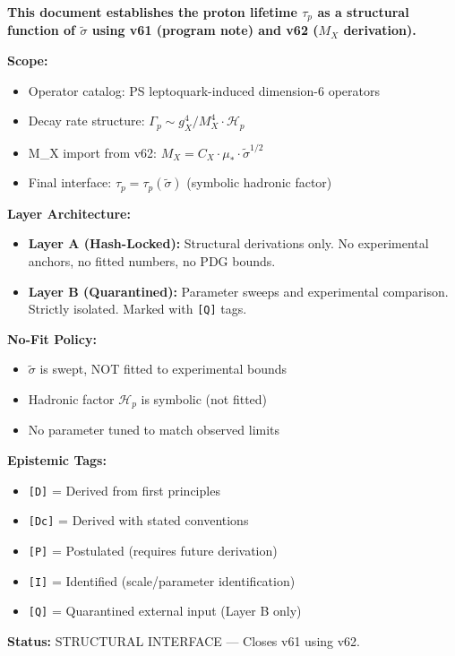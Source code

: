 \documentclass[11pt,a4paper]{article}
\newcommand{\tagD}{\textcolor{green!50!black}{\texttt{[D]}}}
\newcommand{\tagDc}{\textcolor{blue!70!black}{\texttt{[Dc]}}}
\newcommand{\tagP}{\textcolor{orange!80!black}{\texttt{[P]}}}
\newcommand{\tagQ}{\textcolor{red!70!black}{\texttt{[Q]}}}
\newcommand{\tagI}{\textcolor{purple!70!black}{\texttt{[I]}}}
\theoremstyle{definition}
\begin{document}
\begin{readercontract}
\textbf{This document establishes the proton lifetime $\tau_p$ as a structural
function of $\tilde{\sigma}$ using v61 (program note) and v62 ($M_X$ derivation).}

\textbf{Scope:}
\begin{itemize}
  \item Operator catalog: PS leptoquark-induced dimension-6 operators
  \item Decay rate structure: $\Gamma_p \sim g_X^4 / M_X^4 \cdot \mathcal{H}_p$
  \item M\_X import from v62: $M_X = C_X \cdot \mu_* \cdot \tilde{\sigma}^{1/2}$
  \item Final interface: $\tau_p = \tau_p(\tilde{\sigma})$ (symbolic hadronic factor)
\end{itemize}

\textbf{Layer Architecture:}
\begin{itemize}
  \item \textbf{Layer A (Hash-Locked):} Structural derivations only. No experimental
        anchors, no fitted numbers, no PDG bounds.
  \item \textbf{Layer B (Quarantined):} Parameter sweeps and experimental comparison.
        Strictly isolated. Marked with \tagQ{} tags.
\end{itemize}

\textbf{No-Fit Policy:}
\begin{itemize}
  \item $\tilde{\sigma}$ is swept, NOT fitted to experimental bounds
  \item Hadronic factor $\mathcal{H}_p$ is symbolic (not fitted)
  \item No parameter tuned to match observed limits
\end{itemize}

\textbf{Epistemic Tags:}
\begin{itemize}
  \item \tagD{} = Derived from first principles
  \item \tagDc{} = Derived with stated conventions
  \item \tagP{} = Postulated (requires future derivation)
  \item \tagI{} = Identified (scale/parameter identification)
  \item \tagQ{} = Quarantined external input (Layer B only)
\end{itemize}

\textbf{Status:} STRUCTURAL INTERFACE --- Closes v61 using v62.
\end{readercontract}
\end{document}
